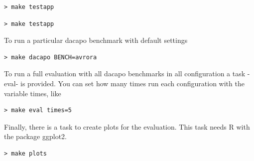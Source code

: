 \begin{lstlisting}[caption=Running testapp,label=usage-parse2]
> make testapp
\end{lstlisting}

\begin{lstlisting}[caption=Running dacapo,label=usage-parse3]
> make testapp
\end{lstlisting}

To run a particular dacapo benchmark with default settings

\begin{lstlisting}[caption=Running dacapo,label=usage-parse4]
> make dacapo BENCH=avrora
\end{lstlisting}

To run a full evaluation with all dacapo benchmarks in all configuration a task -eval- is provided. You can set how many times run each configuration with the variable times, like

\begin{lstlisting}[caption=Running full eval five times,label=usage-parse5]
> make eval times=5
\end{lstlisting}

Finally, there is a task to create plots for the evaluation. This task needs R with the package ggplot2.

\begin{lstlisting}[caption=Plots,label=usage-parse6]
> make plots
\end{lstlisting}

%
%
